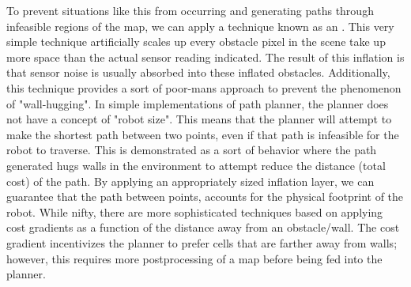 To prevent situations like this from occurring and generating paths through infeasible regions of the map, we can apply a technique known as an . This very simple technique artificially scales up every obstacle pixel in the scene take up more space than the actual sensor reading indicated. The result of this inflation is that sensor noise is usually absorbed into these inflated obstacles. Additionally, this technique provides a sort of poor-mans approach to prevent the phenomenon of "wall-hugging". In simple implementations of path planner, the planner does not have a concept of "robot size". This means that the planner will attempt to make the shortest path between two points, even if that path is infeasible for the robot to traverse. This is demonstrated as a sort of behavior where the path generated hugs walls in the environment to attempt reduce the distance (total cost) of the path. By applying an appropriately sized inflation layer, we can guarantee that the path between points, accounts for the physical footprint of the robot. While nifty, there are more sophisticated techniques based on applying cost gradients as a function of the distance away from an obstacle/wall. The cost gradient incentivizes the planner to prefer cells that are farther away from walls; however, this requires more postprocessing of a map before being fed into the planner.